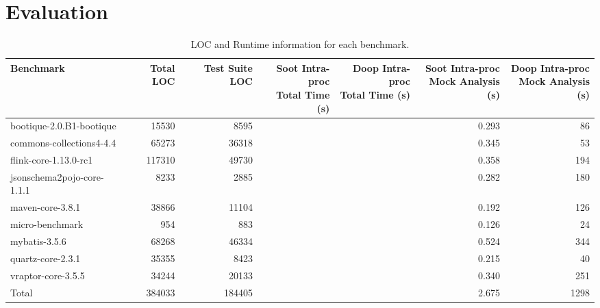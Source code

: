 \section{Evaluation}
\label{sec:evaluation}

\begin{table*}
	\centering
	\caption{LOC and Runtime information for each benchmark.}
	\begin{tabular}{lrrrrrr}
		\toprule
		Benchmark & Total LOC & Test Suite LOC & \thead{Soot Intra-proc \\ Total Time (s)} & \thead{Doop Intra-proc \\ Total Time (s)} & \thead{Soot Intra-proc \\ Mock Analysis (s)}  & \thead{Doop Intra-proc \\ Mock Analysis (s)} \\
		\midrule
		bootique-2.0.B1-bootique           		&  15530   & 8595   &  &  &  0.293   & 86    \\
		commons-collections4-4.4           		&  65273   & 36318  &  &  &  0.345   & 53        \\
		flink-core-1.13.0-rc1           		&  117310  & 49730  &  &  &  0.358   & 194        \\
		jsonschema2pojo-core-1.1.1         		&  8233    & 2885   &  &  &  0.282   & 180       \\
		maven-core-3.8.1   		           		&  38866   & 11104  &  &  &  0.192   & 126        \\
		micro-benchmark         		  		&  954     & 883	&  &  &  0.126   & 24        \\
		mybatis-3.5.6         		  			&  68268   & 46334  &  &  &  0.524   & 344        \\
		quartz-core-2.3.1        	  			&  35355   & 8423   &  &  &  0.215   & 40      \\
		vraptor-core-3.5.5         	  			&  34244   & 20133  &  &  &  0.340   & 251      \\
		\bottomrule
		Total         	  						&  384033  & 184405 &  &  &  2.675   & 1298      \\
	\end{tabular}
	\label{tab:runtimes}
\end{table*}

